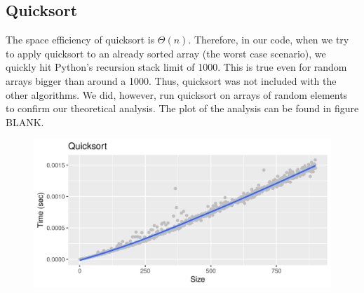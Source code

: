 \documentclass[letterpaper, 11pt]{article}
\begin{document}
\subsection{Quicksort}
The space efficiency of quicksort is \(\Theta(n)\). Therefore, in our code,
when we try to apply quicksort to an already sorted array (the worst case
scenario), we quickly hit Python's recursion stack limit of 1000. This is true
even for random arrays bigger than around a 1000. Thus, quicksort was not
included with the other algorithms. We did, however, run quicksort on arrays of
random elements to confirm our theoretical analysis. The plot of the analysis
can be found in figure BLANK. 

\begin{figure}[h]
  \includegraphics[width=\linewidth]{quick.png}
\end{figure}
\end{document}
